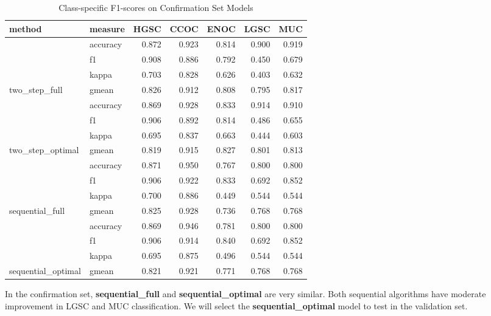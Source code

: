 \documentclass[
]{report}
\begin{document}
\begin{table}

\caption{\label{tab:confirmation-set}Class-specific F1-scores on Confirmation Set Models}
\centering
\begin{tabular}[t]{l|l|r|r|r|r|r}
\hline
method & measure & HGSC & CCOC & ENOC & LGSC & MUC\\
\hline
 & accuracy & 0.872 & 0.923 & 0.814 & 0.900 & 0.919\\
\cline{2-7}
 & f1 & 0.908 & 0.886 & 0.792 & 0.450 & 0.679\\
\cline{2-7}
 & kappa & 0.703 & 0.828 & 0.626 & 0.403 & 0.632\\
\cline{2-7}
\multirow{-4}{*}{\raggedright\arraybackslash two\_step\_full} & gmean & 0.826 & 0.912 & 0.808 & 0.795 & 0.817\\
\cline{1-7}
 & accuracy & 0.869 & 0.928 & 0.833 & 0.914 & 0.910\\
\cline{2-7}
 & f1 & 0.906 & 0.892 & 0.814 & 0.486 & 0.655\\
\cline{2-7}
 & kappa & 0.695 & 0.837 & 0.663 & 0.444 & 0.603\\
\cline{2-7}
\multirow{-4}{*}{\raggedright\arraybackslash two\_step\_optimal} & gmean & 0.819 & 0.915 & 0.827 & 0.801 & 0.813\\
\cline{1-7}
 & accuracy & 0.871 & 0.950 & 0.767 & 0.800 & 0.800\\
\cline{2-7}
 & f1 & 0.906 & 0.922 & 0.833 & 0.692 & 0.852\\
\cline{2-7}
 & kappa & 0.700 & 0.886 & 0.449 & 0.544 & 0.544\\
\cline{2-7}
\multirow{-4}{*}{\raggedright\arraybackslash sequential\_full} & gmean & 0.825 & 0.928 & 0.736 & 0.768 & 0.768\\
\cline{1-7}
 & accuracy & 0.869 & 0.946 & 0.781 & 0.800 & 0.800\\
\cline{2-7}
 & f1 & 0.906 & 0.914 & 0.840 & 0.692 & 0.852\\
\cline{2-7}
 & kappa & 0.695 & 0.875 & 0.496 & 0.544 & 0.544\\
\cline{2-7}
\multirow{-4}{*}{\raggedright\arraybackslash sequential\_optimal} & gmean & 0.821 & 0.921 & 0.771 & 0.768 & 0.768\\
\hline
\end{tabular}
\end{table}

In the confirmation set, \textbf{sequential\_full} and \textbf{sequential\_optimal} are very similar. Both sequential algorithms have moderate improvement in LGSC and MUC classification. We will select the \textbf{sequential\_optimal} model to test in the validation set.
\end{document}
